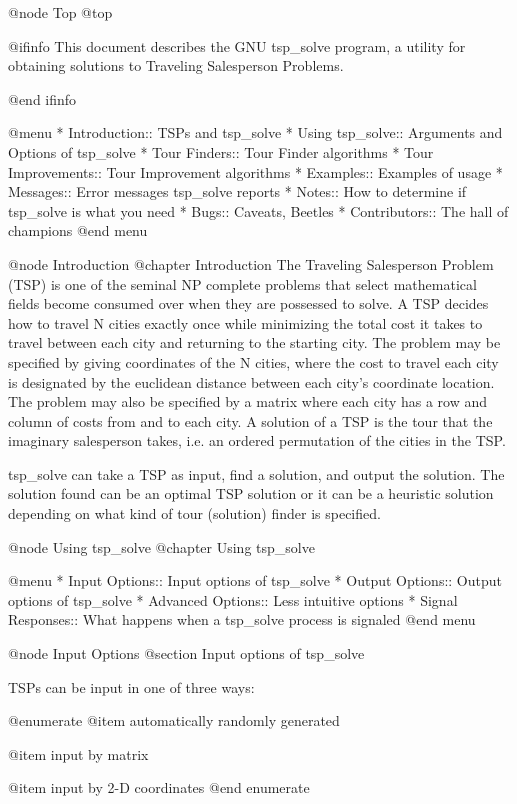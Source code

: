 @node Top
@top

@ifinfo
This document describes the GNU tsp_solve program, a utility for obtaining
solutions to Traveling Salesperson Problems.

@end ifinfo

@menu
* Introduction::       TSPs and tsp_solve
* Using tsp_solve::    Arguments and Options of tsp_solve
* Tour Finders::       Tour Finder algorithms
* Tour Improvements::  Tour Improvement algorithms
* Examples::           Examples of usage
* Messages::           Error messages tsp_solve reports
* Notes::              How to determine if tsp_solve is what you need
* Bugs::               Caveats, Beetles
* Contributors::       The hall of champions
@end menu

@node Introduction
@chapter Introduction
The Traveling Salesperson Problem (TSP) is one of the seminal NP complete
problems that select mathematical fields become consumed over when they are
possessed to solve.  A TSP decides how to travel N cities exactly once while
minimizing the total cost it takes to travel between each city and returning
to the starting city.  The problem may be specified by giving coordinates of
the N cities, where the cost to travel each city is designated by the
euclidean distance between each city's coordinate location.  The problem may
also be specified by a matrix where each city has a row and column of costs
from and to each city.  A solution of a TSP is the tour that the imaginary
salesperson takes, i.e. an ordered permutation of the cities in the TSP.

tsp_solve can take a TSP as input, find a solution, and output the solution.
The solution found can be an optimal TSP solution or it can be a heuristic
solution depending on what kind of tour (solution) finder is specified.

@node Using tsp_solve
@chapter Using tsp_solve

@menu
* Input Options::      Input options of tsp_solve
* Output Options::     Output options of tsp_solve
* Advanced Options::   Less intuitive options
* Signal Responses::   What happens when a tsp_solve process is signaled
@end menu

@node Input Options
@section Input options of tsp_solve

TSPs can be input in one of three ways:

@enumerate
@item
automatically randomly generated

@item
input by matrix

@item
input by 2-D coordinates
@end enumerate

